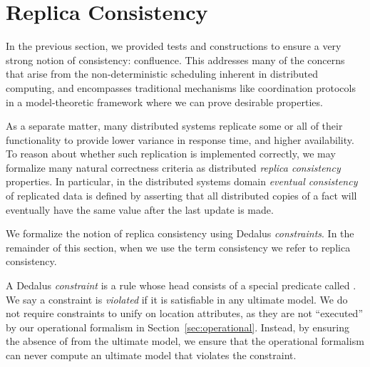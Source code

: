 \section{Replica Consistency}
\label{sec:consistency}

In the previous section, we provided tests and constructions to ensure a very strong notion of consistency: confluence.  This addresses many of the concerns that arise from the non-deterministic scheduling inherent in distributed computing, and encompasses traditional mechanisms like coordination protocols in a model-theoretic framework where we can prove desirable properties.

As a separate matter, many distributed systems replicate some or all of their functionality to provide lower variance in response time, and higher availability.  
To reason about whether such replication is implemented correctly, we may formalize many
natural correctness criteria as distributed {\em replica consistency} properties.
In particular, in the distributed systems domain {\em eventual consistency} of replicated data is defined by asserting that all distributed copies of a fact will eventually have the same value after the last update is made. 

We formalize the notion of replica consistency using Dedalus {\em constraints}.  In the remainder of this section, when we use the term consistency we refer to replica consistency. %

\begin{definition}
A Dedalus {\em constraint} is a rule whose head consists of a special predicate called .  We say a constraint is {\em violated} if it is satisfiable in any ultimate model.  We do not require constraints to unify on location attributes, as they are not ``executed'' by our operational formalism in Section~\ref{sec:operational}.  Instead, by ensuring the absence of  from the ultimate model, we ensure that the operational formalism can never compute an ultimate model that violates the constraint.
\end{definition}

